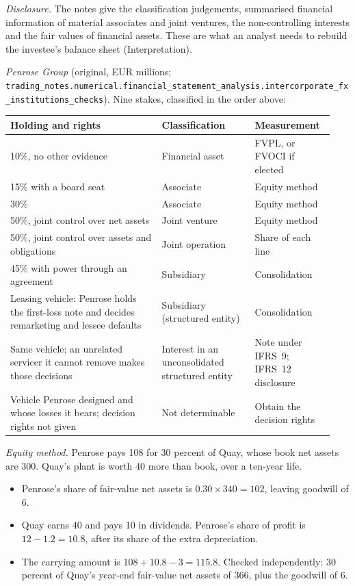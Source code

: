 \begin{qfdefinition}
\emph{Disclosure.} The notes give the classification judgements, summarised financial information of material associates and joint ventures, the non-controlling interests and the fair values of financial assets. These are what an analyst needs to rebuild the investee's balance sheet (Interpretation).

 \emph{Penrose Group} (original, EUR millions; \nolinkurl{trading_notes.numerical.financial_statement_analysis.intercorporate_fx_institutions_checks}). Nine stakes, classified in the order above:
\begin{center}\small
\begin{tabular}{@{}p{0.44\linewidth}p{0.27\linewidth}p{0.23\linewidth}@{}}
\toprule
Holding and rights & Classification & Measurement \\
\midrule
10\%, no other evidence & Financial asset & FVPL, or FVOCI if elected \\
15\% with a board seat & Associate & Equity method \\
30\% & Associate & Equity method \\
50\%, joint control over net assets & Joint venture & Equity method \\
50\%, joint control over assets and obligations & Joint operation & Share of each line \\
45\% with power through an agreement & Subsidiary & Consolidation \\
Leasing vehicle: Penrose holds the first-loss note and decides remarketing and lessee defaults & Subsidiary (structured entity) & Consolidation \\
Same vehicle; an unrelated servicer it cannot remove makes those decisions & Interest in an unconsolidated structured entity & Note under IFRS~9; IFRS~12 disclosure \\
Vehicle Penrose designed and whose losses it bears; decision rights not given & Not determinable & Obtain the decision rights \\
\bottomrule
\end{tabular}
\end{center}

\emph{Equity method.} Penrose pays 108 for 30 percent of Quay, whose book net assets are 300. Quay's plant is worth 40 more than book, over a ten-year life.
\begin{itemize}
\item Penrose's share of fair-value net assets is $0.30\times340=102$, leaving goodwill of 6.
\item Quay earns 40 and pays 10 in dividends. Penrose's share of profit is $12-1.2=10.8$, after its share of the extra depreciation.
\item The carrying amount is $108+10.8-3=115.8$. Checked independently: 30 percent of Quay's year-end fair-value net assets of 366, plus the goodwill of 6.
\end{itemize}


\end{qfdefinition}
